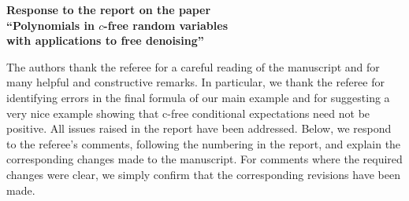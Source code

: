 \documentclass[12pt]{report}
\begin{document}
\begin{center}
\large\textbf{Response to the report on the paper \\``Polynomials in $c$-free random variables \\ with applications to free denoising''}
\end{center}
The authors thank the referee for a careful reading of the manuscript and for many helpful and constructive remarks. In particular, we thank the referee for identifying errors in the final formula of our main example and for suggesting a very nice example showing that c-free conditional expectations need not be positive. All issues raised in the report have been addressed. Below, we respond to the referee’s comments, following the numbering in the report, and explain the corresponding changes made to the manuscript. For comments where the required changes were clear, we simply confirm that the corresponding revisions have been made.
\end{document}

